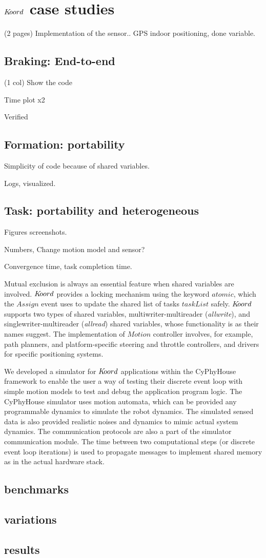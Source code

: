 \section{$K\kern-2pt oord$ case studies}

(2 pages)
Implementation of the sensor.. GPS indoor positioning, done variable. 
%

\subsection{Braking: End-to-end}
\label{sec:braking}
(1 col)
Show the code

Time plot x2

Verified
\subsection{Formation: portability}
\label{sec:braking}

Simplicity of code because of shared variables.

Logs, visualized.

\subsection{Task: portability and heterogeneous}

Figures screenshots. 

Numbers, Change motion model and sensor? 


Convergence time, task completion time.



Mutual exclusion is always an essential feature when shared variables are involved. $K\kern-2pt oord$ provides a locking mechanism using the keyword $\mathit{atomic}$, which the $\mathit{Assign}$ event uses to update the shared list of tasks $\mathit{taskList}$ safely. $K\kern-2pt oord$ supports two types of shared variables, multiwriter-multireader (\emph{allwrite}), and singlewriter-multireader (\emph{allread}) shared variables, whose functionality is as their names suggest. 
The implementation of $\mathit{Motion}$ controller involves, for example, path planners, and platform-specific steering and throttle controllers, and drivers for specific positioning systems. 

We developed a simulator  for $K\kern-2pt oord$ applications within the CyPhyHouse framework to enable the user a way of testing their discrete event loop with simple motion models to test and debug the application program logic. The CyPhyHouse simulator uses motion automata, which can be provided any programmable dynamics to simulate the robot dynamics. The simulated sensed data is also provided realistic noises and dynamics to mimic actual system dynamics. The communication protocols are also a part of the simulator communication module. The time between two computational steps (or discrete event loop iterations) is used to propagate messages to implement shared memory as in the actual hardware stack.
\subsection{benchmarks}
\subsection{variations}
\subsection{results}